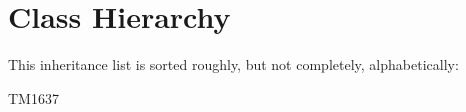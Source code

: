 \section{Class Hierarchy}
This inheritance list is sorted roughly, but not completely, alphabetically\+:\begin{DoxyCompactList}
\item T\+M1637\begin{DoxyCompactList}
\item {}
\end{DoxyCompactList}
\end{DoxyCompactList}
